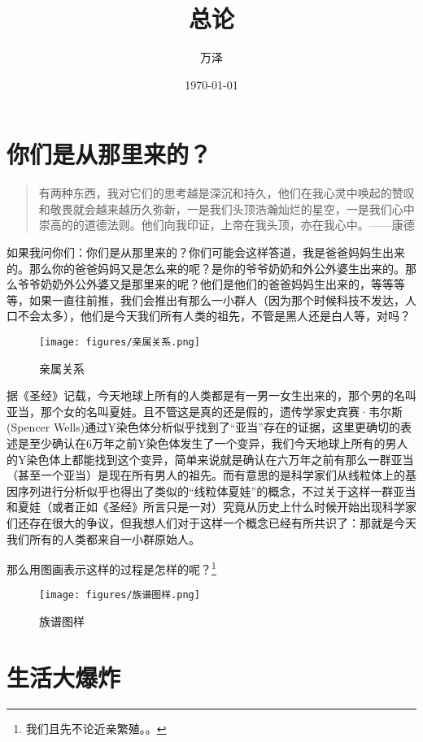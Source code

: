 \documentclass[11pt,oneside]{article}
\author{万泽}
\date{\today}
\title{总论}
\begin{document}
\maketitle
\tableofcontents



\section{你们是从那里来的？}
\label{sec-1}
\begin{quote}
有两种东西，我对它们的思考越是深沉和持久，他们在我心灵中唤起的赞叹和敬畏就会越来越历久弥新，一是我们头顶浩瀚灿烂的星空，一是我们心中崇高的的道德法则。他们向我印证，上帝在我头顶，亦在我心中。——康德
\end{quote}

如果我问你们：你们是从那里来的？你们可能会这样答道，我是爸爸妈妈生出来的。那么你的爸爸妈妈又是怎么来的呢？是你的爷爷奶奶和外公外婆生出来的。那么爷爷奶奶外公外婆又是那里来的呢？他们是他们的爸爸妈妈生出来的，等等等等，如果一直往前推，我们会推出有那么一小群人（因为那个时候科技不发达，人口不会太多），他们是今天我们所有人类的祖先，不管是黑人还是白人等，对吗？
\begin{figure}[H]
\centering
\texttt{[image: figures/亲属关系.png]}
\caption{亲属关系}
\end{figure}

据《圣经》记载，今天地球上所有的人类都是有一男一女生出来的，那个男的名叫亚当，那个女的名叫夏娃。且不管这是真的还是假的，遗传学家史宾赛·韦尔斯(Spencer Wells)通过Y染色体分析似乎找到了“亚当”存在的证据，这里更确切的表述是至少确认在6万年之前Y染色体发生了一个变异，我们今天地球上所有的男人的Y染色体上都能找到这个变异，简单来说就是确认在六万年之前有那么一群亚当（甚至一个亚当）是现在所有男人的祖先。而有意思的是科学家们从线粒体上的基因序列进行分析似乎也得出了类似的“线粒体夏娃”的概念，不过关于这样一群亚当和夏娃（或者正如《圣经》所言只是一对）究竟从历史上什么时候开始出现科学家们还存在很大的争议，但我想人们对于这样一个概念已经有所共识了：那就是今天我们所有的人类都来自一小群原始人。

那么用图画表示这样的过程是怎样的呢？\footnote{我们且先不论近亲繁殖。。}

\begin{figure}[H]
\centering
\texttt{[image: figures/族谱图样.png]}
\caption{族谱图样}
\end{figure}


\section{生活大爆炸}
\label{sec-2}
\end{document}
